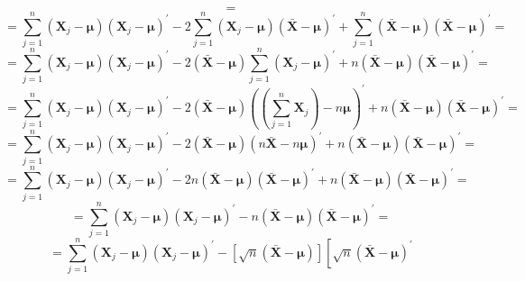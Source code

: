 \begin{enumerate}[label= (\alph*)]
\[{{        }
        }
        =
    \]
    \[
        =
        \scriptstyle{
        \sum_{j=1}^{n}{
            (\textbf{X}_{j} - \bm{\mu}){(\textbf{X}_{j} - \bm{\mu})}^{\prime}
        }
        -
        2
        \sum_{j=1}^{n}{
            (\textbf{X}_{j} - \bm{\mu}){(\bar{\textbf{X}} - \bm{\mu})}^{\prime}
        }
        +
        \sum_{j=1}^{n}{
            (\bar{\textbf{X}} - \bm{\mu}){(\bar{\textbf{X}} - \bm{\mu})}^{\prime}
        }
        }
        =
    \]
    \[
        =
        \scriptstyle{
        \sum_{j=1}^{n}{
            (\textbf{X}_{j} - \bm{\mu}){(\textbf{X}_{j} - \bm{\mu})}^{\prime}
        }
        -
        2
        (\bar{\textbf{X}} - \bm{\mu})
        \sum_{j=1}^{n}{
            {(\textbf{X}_{j} - \bm{\mu})}^{\prime}
        }
        +
        n
        (\bar{\textbf{X}} - \bm{\mu}){(\bar{\textbf{X}} - \bm{\mu})}^{\prime}
        }
        =
    \]
    \[
        =
        \scriptstyle{
        \sum_{j=1}^{n}{
            (\textbf{X}_{j} - \bm{\mu}){(\textbf{X}_{j} - \bm{\mu})}^{\prime}
        }
        -
        2
        (\bar{\textbf{X}} - \bm{\mu})
        {((\sum_{j=1}^{n}{\textbf{X}_{j}}) - n\bm{\mu})}^{\prime}
        +
        n
        (\bar{\textbf{X}} - \bm{\mu}){(\bar{\textbf{X}} - \bm{\mu})}^{\prime}
        }
        =
    \]
    \[
        =
        \scriptstyle{
        \sum_{j=1}^{n}{
            (\textbf{X}_{j} - \bm{\mu}){(\textbf{X}_{j} - \bm{\mu})}^{\prime}
        }
        -
        2
        (\bar{\textbf{X}} - \bm{\mu})
        {(n\bar{\textbf{X}} - n\bm{\mu})}^{\prime}
        +
        n
        (\bar{\textbf{X}} - \bm{\mu}){(\bar{\textbf{X}} - \bm{\mu})}^{\prime}
        }
        =
    \]
    \[
        =
        \scriptstyle{
        \sum_{j=1}^{n}{
            (\textbf{X}_{j} - \bm{\mu}){(\textbf{X}_{j} - \bm{\mu})}^{\prime}
        }
        -
        2n
        (\bar{\textbf{X}} - \bm{\mu})
        {(\bar{\textbf{X}} - \bm{\mu})}^{\prime}
        +
        n
        (\bar{\textbf{X}} - \bm{\mu}){(\bar{\textbf{X}} - \bm{\mu})}^{\prime}
        }
        =
    \]
    \[
        =
        \sum_{j=1}^{n}{
            (\textbf{X}_{j} - \bm{\mu}){(\textbf{X}_{j} - \bm{\mu})}^{\prime}
        }
        -
        n
        (\bar{\textbf{X}} - \bm{\mu})
        {(\bar{\textbf{X}} - \bm{\mu})}^{\prime}
        =
    \]
    \[
        =
        \sum_{j=1}^{n}{
            (\textbf{X}_{j} - \bm{\mu}){(\textbf{X}_{j} - \bm{\mu})}^{\prime}
        }
        -
        \left[
            \sqrt{n}
            (\bar{\textbf{X}} - \bm{\mu})
        \right]
        \left[
            \sqrt{n}
            {(\bar{\textbf{X}} - \bm{\mu})}^{\prime}
\]
\end{enumerate}
